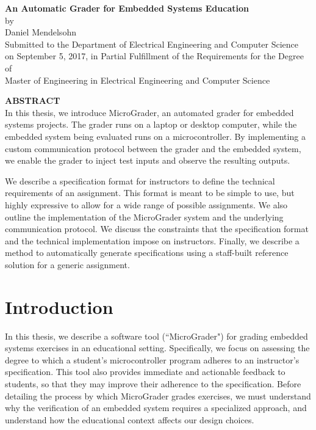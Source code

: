 \documentclass[12pt]{article}
\newcommand{\mytitle}{\textbf{An Automatic Grader for Embedded Systems Education}}
\newcommand{\mydate}{September 5, 2017}
\begin{document}
\addtocounter{page}{1}

\newpage
\mbox{}
\newpage

\begin{center}
\mytitle \\
by \\
Daniel Mendelsohn \\
\vspace{12pt}
Submitted to the Department of Electrical Engineering and Computer Science\\
 on \mydate{}, in Partial Fulfillment of the Requirements for the Degree of\\
 Master of Engineering in Electrical Engineering and Computer Science
\end{center}
\vspace{12pt}
\textbf{ABSTRACT} \\

\noindent In this thesis, we introduce MicroGrader, an automated grader for embedded systems projects.  The grader runs on a laptop or desktop computer, while the embedded system being evaluated runs on a microcontroller.  By implementing a custom communication protocol between the grader and the embedded system, we enable the grader to inject test inputs and observe the resulting outputs.

We describe a specification format for instructors to define the technical requirements of an assignment.  This format is meant to be simple to use, but highly expressive to allow for a wide range of possible assignments.  We also outline the implementation of the MicroGrader system and the underlying communication protocol.  We discuss the constraints that the specification format and the technical implementation impose on instructors.  Finally, we describe a method to automatically generate specifications using a staff-built reference solution for a generic assignment. 

\newpage
\mbox{}
\newpage

\tableofcontents

\newpage
\listoffigures
\listoftables

\doublespacing

\newpage
\section{Introduction}
In this thesis, we describe a software tool (``MicroGrader") for grading embedded systems exercises in an educational setting.  Specifically, we focus on assessing the degree to which a student's microcontroller program adheres to an instructor's specification.  This tool also provides immediate and actionable feedback to students, so that they may improve their adherence to the specification.  Before detailing the process by which MicroGrader grades exercises, we must understand why the verification of an embedded system requires a specialized approach, and understand how the educational context affects our design choices.
\end{document}
